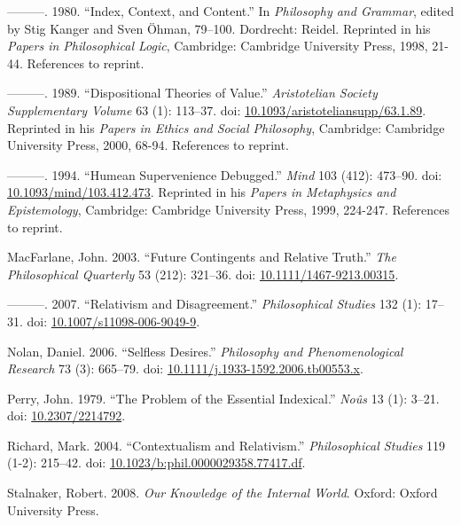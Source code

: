 \documentclass[
  10pt,
  letterpaper,
  DIV=11,
  numbers=noendperiod,
  twoside]{scrartcl}
\newlength{\cslhangindent}
\newenvironment{CSLReferences}[2] %
 {\begin{list}{}{%
  \setlength{\itemindent}{0pt}
  \setlength{\leftmargin}{0pt}
  \setlength{\parsep}{0pt}
  \ifodd #1
   \setlength{\leftmargin}{\cslhangindent}
   \setlength{\itemindent}{-1\cslhangindent}
  \fi
  \setlength{\itemsep}{#2\baselineskip}}}
 {\end{list}}
\begin{document}
\begin{CSLReferences}{1}{0}
---------. 1980. {``Index, Context, and Content.''} In \emph{Philosophy
and Grammar}, edited by Stig Kanger and Sven Öhman, 79--100. Dordrecht:
Reidel. Reprinted in his \emph{Papers in Philosophical Logic},
Cambridge: Cambridge University Press, 1998, 21-44. References to
reprint.

---------. 1989. {``Dispositional Theories of Value.''}
\emph{Aristotelian Society Supplementary Volume} 63 (1): 113--37. doi:
\href{https://doi.org/10.1093/aristoteliansupp/63.1.89}{10.1093/aristoteliansupp/63.1.89}.
Reprinted in his \emph{Papers in Ethics and Social Philosophy},
Cambridge: Cambridge University Press, 2000, 68-94. References to
reprint.

---------. 1994. {``Humean Supervenience Debugged.''} \emph{Mind} 103
(412): 473--90. doi:
\href{https://doi.org/10.1093/mind/103.412.473}{10.1093/mind/103.412.473}.
Reprinted in his \emph{Papers in Metaphysics and Epistemology},
Cambridge: Cambridge University Press, 1999, 224-247. References to
reprint.

MacFarlane, John. 2003. {``Future Contingents and Relative Truth.''}
\emph{The Philosophical Quarterly} 53 (212): 321--36. doi:
\href{https://doi.org/10.1111/1467-9213.00315}{10.1111/1467-9213.00315}.

---------. 2007. {``{Relativism and Disagreement}.''}
\emph{Philosophical Studies} 132 (1): 17--31. doi:
\href{https://doi.org/10.1007/s11098-006-9049-9}{10.1007/s11098-006-9049-9}.

Nolan, Daniel. 2006. {``Selfless Desires.''} \emph{Philosophy and
Phenomenological Research} 73 (3): 665--79. doi:
\href{https://doi.org/10.1111/j.1933-1592.2006.tb00553.x}{10.1111/j.1933-1592.2006.tb00553.x}.

Perry, John. 1979. {``The Problem of the Essential Indexical.''}
\emph{No{û}s} 13 (1): 3--21. doi:
\href{https://doi.org/10.2307/2214792}{10.2307/2214792}.

Richard, Mark. 2004. {``Contextualism and Relativism.''}
\emph{Philosophical Studies} 119 (1-2): 215--42. doi:
\href{https://doi.org/10.1023/b:phil.0000029358.77417.df}{10.1023/b:phil.0000029358.77417.df}.

Stalnaker, Robert. 2008. \emph{Our Knowledge of the Internal World}.
Oxford: Oxford University Press.


\end{CSLReferences}
\end{document}
